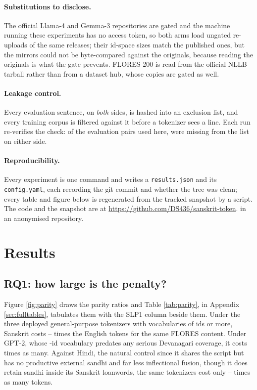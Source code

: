 \documentclass[11pt]{article}
\begin{document}
\paragraph{Substitutions to disclose.} The official Llama-4 and Gemma-3 repositories are
gated and the machine running these experiments has no access token, so both arms load
ungated re-uploads of the same releases; their id-space sizes match the published ones, but
the mirrors could not be byte-compared against the originals, because reading the originals
is what the gate prevents. FLORES-200 is read from the official NLLB tarball rather than
from a dataset hub, whose copies are gated as well.

\paragraph{Leakage control.} Every evaluation sentence, on \emph{both} sides, is hashed
into an exclusion list, and every training corpus is filtered against it before a
tokenizer sees a line. Each run re-verifies the check: of the \numCheckedSentences{}
evaluation pairs used here, \numLeakedSentences{} were missing from the list on either
side.

\paragraph{Reproducibility.} Every experiment is one command and writes a
\texttt{results.json} and its \texttt{config.yaml}, each recording the git commit and
whether the tree was clean; every table and figure below is regenerated from the tracked
snapshot by a script. The code and the snapshot are
\iffinalmode
at \url{https://github.com/DS436/sanskrit-token}.
\else
in an anonymised repository.
\fi

\section{Results}
\label{sec:results}

\subsection{RQ1: how large is the penalty?}
\label{sec:rq1}

Figure \ref{fig:parity} draws the parity ratios and Table \ref{tab:parity}, in
Appendix \ref{sec:fulltables}, tabulates them with the SLP1 column beside them.
Under the three deployed general-purpose tokenizers with vocabularies of
\numLargeVocabFloor{} ids or more,
Sanskrit costs \numParitySaEnLo--\numParitySaEnHi{} times the English tokens for the same
FLORES content. Under GPT-2, whose \numVocabMin-id vocabulary predates any serious
Devanagari coverage, it costs \numParitySaEnGptTwo{} times as many. Against Hindi, the
natural control since it shares the script but has no productive external sandhi and far
less inflectional fusion, though it does retain sandhi inside its Sanskrit loanwords,
the same tokenizers cost only \numParitySaHiLo--\numParitySaHiHi{} times as many tokens.
\end{document}
